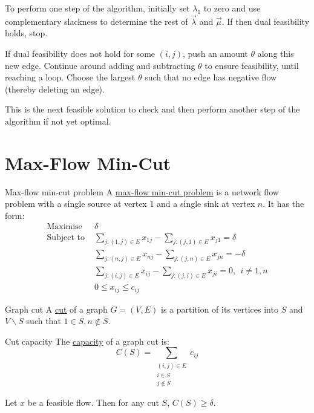 \documentclass[../Main.tex]{subfiles}
\begin{document}
To perform one step of the algorithm, initially set $\lambda_1$ to zero and use complementary slackness to determine the rest of $\vec{\lambda}$ and $\vec{\mu}$. If then dual feasibility holds, stop.

If dual feasibility does not hold for some $(i, j)$, push an amount $\theta$ along this new edge. Continue around adding and subtracting $\theta$ to ensure feasibility, until reaching a loop. Choose the largest $\theta$ such that no edge has negative flow (thereby deleting an edge).

This is the next feasible solution to check and then perform another step of the algorithm if not yet optimal.
\section{Max-Flow Min-Cut}
\begin{definition}{Max-flow min-cut problem}
    A \underline{max-flow min-cut problem} is a network flow problem with a single source at vertex $1$ and a single sink at vertex $n$. It has the form:
    \begin{align*}
        \text{Maximise } &\delta \\
        \text{Subject to } & \sum_{j : (1, j) \in E} x_{1j} - \sum_{j : (j, 1) \in E} x_{j1} = \delta \\
        & \sum_{j : (n, j) \in E} x_{nj} - \sum_{j : (j, n) \in E} x_{jn} = -\delta \\
        & \sum_{j : (i, j) \in E}x_{ij} - \sum_{j : (j, i) \in E} x_{ji} = 0,~~i \neq 1, n \\
        &0 \leq x_{ij} \leq c_{ij}
    \end{align*}
\end{definition}
\begin{definition}{Graph cut}
    A \underline{cut} of a graph $G = (V, E)$ is a partition of its vertices into $S$ and $V \backslash S$ such that $1 \in S, n \notin S$.
\end{definition}
\begin{definition}{Cut capacity}
    The \underline{capacity} of a graph cut is:
    \begin{equation*}
        C(S) = \sum_{\substack{(i, j) \in E\\i \in S\\j \notin S}} c_{ij}
    \end{equation*}
\end{definition}
\begin{proposition}
    Let $x$ be a feasible flow. Then for any cut $S$, $C(S) \geq \delta$.
    \label{propMaxFlowAtLeastMinCut}
\end{proposition}
\end{document}
